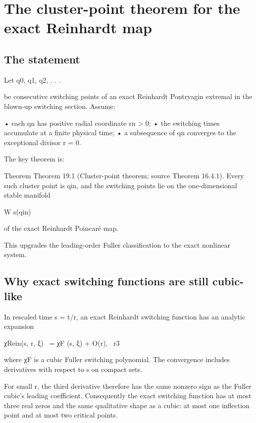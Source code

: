 \chapter{The cluster-point theorem for the exact Reinhardt map}
\section{The statement}

Let q0, q1, q2, . . .


be consecutive switching points of an exact Reinhardt Pontryagin extremal in the blown-up switching section. Assume:


• each qn has positive radial coordinate rn > 0; • the switching times accumulate at a finite physical time; • a subsequence of qn converges to the exceptional divisor r = 0.


The key theorem is:


\begin{statementbox}{Theorem}
Theorem 19.1 (Cluster-point theorem; source Theorem 16.4.1). Every such cluster point is qin, and the switching points lie on the one-dimensional stable manifold
\end{statementbox}

W s(qin)


of the exact Reinhardt Poincaré map.


This upgrades the leading-order Fuller classification to the exact nonlinear system.


\section{Why exact switching functions are still cubic-like}

In rescaled time s = t/r, an exact Reinhardt switching function has an analytic expansion


\begin{displaytext}
χRein(s, r, ξ) \
= χF (s, ξ) + O(r), \
r3
\end{displaytext}

where χF is a cubic Fuller switching polynomial. The convergence includes derivatives with respect to s on compact sets.


For small r, the third derivative therefore has the same nonzero sign as the Fuller cubic’s leading coefficient. Consequently the exact switching function has at most three real zeros and the same qualitative shape as a cubic: at most one inflection point and at most two critical points.


